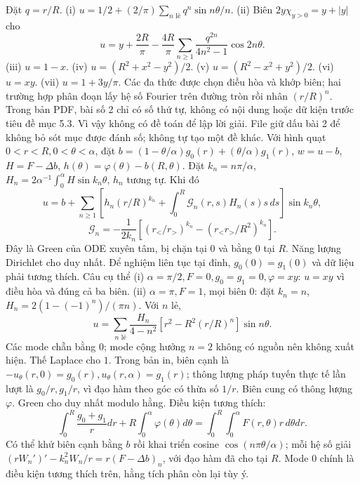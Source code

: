 Đặt $q=r/R$. (i) $u=1/2+(2/\pi)\sum_{n\text{ lẻ}}q^n\sin n\theta/n$.
(ii) Biên $2y\chi_{y>0}=y+|y|$ cho
\[u=y+\frac{2R}\pi-\frac{4R}\pi\sum_{n\ge1}\frac{q^{2n}}{4n^2-1}\cos2n\theta.\]
(iii) $u=1-x$.
(iv) $u=(R^2+x^2-y^2)/2$.
(v) $u=(R^2-x^2+y^2)/2$.
(vi) $u=xy$.
(vii) $u=1+3y/\pi$.
Các đa thức được chọn điều hòa và khớp biên; hai trường hợp phân đoạn lấy hệ số Fourier trên đường tròn rồi nhân $(r/R)^n$.
Trong bản PDF, bài số 2 chỉ có số thứ tự, không có nội dung hoặc dữ kiện trước tiêu đề mục 5.3. Vì vậy không có đề toán để lập lời giải. File giữ dấu bài 2 để không bỏ sót mục được đánh số; không tự tạo một đề khác.
Với hình quạt $0<r<R,0<\theta<\alpha$, đặt $b=(1-\theta/\alpha)g_0(r)+(\theta/\alpha)g_1(r)$, $w=u-b$, $H=F-\Delta b$, $h(\theta)=\varphi(\theta)-b(R,\theta)$. Đặt $k_n=n\pi/\alpha$, $H_n=2\alpha^{-1}\int_0^\alpha H\sin k_n\theta$, $h_n$ tương tự. Khi đó
\[u=b+\sum_{n\ge1}\left[h_n(r/R)^{k_n}+\int_0^R\mathcal G_n(r,s)H_n(s)s\,ds\right]\sin k_n\theta,\]
\[\mathcal G_n=-\frac1{2k_n}\left[(r_</r_>)^{k_n}-(r_<r_>/R^2)^{k_n}\right].\]
Đây là Green của ODE xuyên tâm, bị chặn tại 0 và bằng 0 tại $R$. Năng lượng Dirichlet cho duy nhất. Để nghiệm liên tục tại đỉnh, $g_0(0)=g_1(0)$ và dữ liệu phải tương thích.
Câu cụ thể (i) $\alpha=\pi/2,F=0,g_0=g_1=0,\varphi=xy$: $u=xy$ vì điều hòa và đúng cả ba biên. (ii) $\alpha=\pi,F=1$, mọi biên 0: đặt $k_n=n$, $H_n=2(1-(-1)^n)/(\pi n)$. Với $n$ lẻ,
\[u=\sum_{n\text{ lẻ}}\frac{H_n}{4-n^2}[r^2-R^2(r/R)^n]\sin n\theta.\]
Các mode chẵn bằng 0; mode cộng hưởng $n=2$ không có nguồn nên không xuất hiện. Thế Laplace cho $1$.
Trong bản in, biên cạnh là $-u_\theta(r,0)=g_0(r),u_\theta(r,\alpha)=g_1(r)$; thông lượng pháp tuyến thực tế lần lượt là $g_0/r,g_1/r$, vì đạo hàm theo góc có thừa số $1/r$. Biên cung có thông lượng $\varphi$. Green cho duy nhất modulo hằng. Điều kiện tương thích:
\[\int_0^R\frac{g_0+g_1}{r}dr+R\int_0^\alpha\varphi(\theta)d\theta=\int_0^R\int_0^\alpha F(r,\theta)r\,d\theta dr.\]
Có thể khử biên cạnh bằng $b$ rồi khai triển cosine $\cos(n\pi\theta/\alpha)$; mỗi hệ số giải $(rW_n')'-k_n^2W_n/r=r(F-\Delta b)_n$, với đạo hàm đã cho tại $R$. Mode 0 chính là điều kiện tương thích trên, hằng tích phân còn lại tùy ý.


